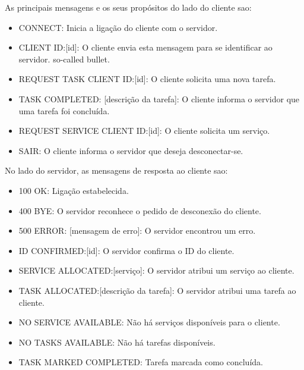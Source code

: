 \documentclass[12pt]{article}
\begin{document}
\noindent As principais mensagens e os seus propósitos do lado do cliente sao:
\begin{itemize}
  \item CONNECT: Inicia a ligação do cliente com o servidor.
  \item CLIENT ID:[id]: O cliente envia esta mensagem para se identificar ao servidor. so-called bullet.
  \item REQUEST TASK CLIENT ID:[id]: O cliente solicita uma nova tarefa.
  \item TASK COMPLETED: [descrição da tarefa]: O cliente informa o servidor que uma tarefa foi concluída.
  \item REQUEST SERVICE CLIENT ID:[id]: O cliente solicita um serviço.
  \item SAIR: O cliente informa o servidor que deseja desconectar-se.
\end{itemize}

\noindent No lado do servidor, as mensagens de resposta ao cliente sao:  
\begin{itemize}
  \item 100 OK: Ligação estabelecida.
  \item 400 BYE: O servidor reconhece o pedido de desconexão do cliente.
  \item 500 ERROR: [mensagem de erro]: O servidor encontrou um erro.
  \item ID CONFIRMED:[id]: O servidor confirma o ID do cliente.
  \item SERVICE ALLOCATED:[serviço]: O servidor atribui um serviço ao cliente.
  \item TASK ALLOCATED:[descrição da tarefa]: O servidor atribui uma tarefa ao cliente.
  \item NO SERVICE AVAILABLE: Não há serviços disponíveis para o cliente.
  \item NO TASKS AVAILABLE: Não há tarefas disponíveis.
  \item TASK MARKED COMPLETED: Tarefa marcada como concluída.
\end{itemize}
\end{document}
